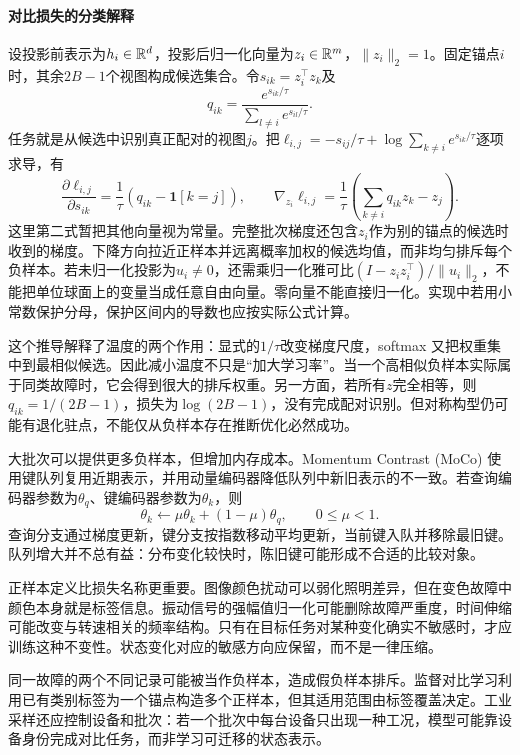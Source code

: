 \paragraph{对比损失的分类解释}
设投影前表示为$h_i\in\mathbb{R}^d$，投影后归一化向量为$z_i\in\mathbb{R}^m$，$\|z_i\|_2=1$。固定锚点$i$时，其余$2B-1$个视图构成候选集合。令$s_{ik}=z_i^\top z_k$及
\begin{equation}
 q_{ik}=\frac{e^{s_{ik}/\tau}}{\sum_{l\ne i}e^{s_{il}/\tau}}.
\end{equation}
任务就是从候选中识别真正配对的视图$j$。把$\ell_{i,j}=-s_{ij}/\tau+\log\sum_{k\ne i}e^{s_{ik}/\tau}$逐项求导，有
\begin{equation}
 \frac{\partial\ell_{i,j}}{\partial s_{ik}}
 =\frac1\tau(q_{ik}-\mathbf1[k=j]),\qquad
 \nabla_{z_i}\ell_{i,j}
 =\frac1\tau\left(\sum_{k\ne i}q_{ik}z_k-z_j\right).
\end{equation}
这里第二式暂把其他向量视为常量。完整批次梯度还包含$z_i$作为别的锚点的候选时收到的梯度。下降方向拉近正样本并远离概率加权的候选均值，而非均匀排斥每个负样本。若未归一化投影为$u_i\ne0$，还需乘归一化雅可比$(I-z_iz_i^\top)/\|u_i\|_2$，不能把单位球面上的变量当成任意自由向量。零向量不能直接归一化。实现中若用小常数保护分母，保护区间内的导数也应按实际公式计算。

这个推导解释了温度的两个作用：显式的$1/\tau$改变梯度尺度，softmax 又把权重集中到最相似候选。因此减小温度不只是“加大学习率”。当一个高相似负样本实际属于同类故障时，它会得到很大的排斥权重。另一方面，若所有$z$完全相等，则$q_{ik}=1/(2B-1)$，损失为$\log(2B-1)$，没有完成配对识别。但对称构型仍可能有退化驻点，不能仅从负样本存在推断优化必然成功。

大批次可以提供更多负样本，但增加内存成本。Momentum Contrast (MoCo) 使用键队列复用近期表示，并用动量编码器降低队列中新旧表示的不一致\cite{he2020moco}。若查询编码器参数为$\theta_q$、键编码器参数为$\theta_k$，则
\begin{equation}
 \theta_k\leftarrow\mu\theta_k+(1-\mu)\theta_q,\qquad 0\leq\mu<1.
\end{equation}
查询分支通过梯度更新，键分支按指数移动平均更新，当前键入队并移除最旧键。队列增大并不总有益：分布变化较快时，陈旧键可能形成不合适的比较对象。

正样本定义比损失名称更重要。图像颜色扰动可以弱化照明差异，但在变色故障中颜色本身就是标签信息。振动信号的强幅值归一化可能删除故障严重度，时间伸缩可能改变与转速相关的频率结构。只有在目标任务对某种变化确实不敏感时，才应训练这种不变性。状态变化对应的敏感方向应保留，而不是一律压缩。

同一故障的两个不同记录可能被当作负样本，造成假负样本排斥。监督对比学习利用已有类别标签为一个锚点构造多个正样本\cite{khosla2020supcon}，但其适用范围由标签覆盖决定。工业采样还应控制设备和批次：若一个批次中每台设备只出现一种工况，模型可能靠设备身份完成对比任务，而非学习可迁移的状态表示。

